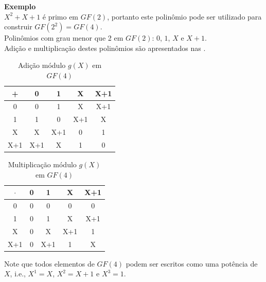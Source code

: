 \begin{frame}[allowframebreaks]
  \framebreak
  \textbf{Exemplo}\\
  $X^2 + X + 1$ é primo em $GF(2)$, portanto este polinômio pode ser utilizado para construir $GF(2^2) = GF(4)$.\\
  Polinômios com grau menor que 2 em $GF(2)$: $0$, $1$, $X$ e $X+1$.\\
  Adição e multiplicação destes polinômios são apresentados nas .
  \begin{minipage}{.45\linewidth}
    \small
    \begin{table}
      \caption{Adição módulo $g(X)$ em $GF(4)$}\label{tab-adgf4}
      \begin{tabular}{c|cccc}
        + & 0 & 1 & X & X+1 \\
        \hline
        0 & 0 & 1 & X & X+1 \\
        1 & 1 & 0 & X+1 & X \\
        X & X & X+1 & 0 & 1 \\
        X+1 & X+1 & X & 1 & 0 
      \end{tabular}
    \end{table}
  \end{minipage}%
  \begin{minipage}{.45\linewidth}
    \small
    \begin{table}
      \caption{Multiplicação módulo $g(X)$ em $GF(4)$}\label{tab-mugf4}
      \begin{tabular}{c|cccc}
        $\cdot$ & 0 & 1 & X & X+1 \\
        \hline
        0 & 0 & 0 & 0 & 0 \\
        1 & 0 & 1 & X & X+1 \\
        X & 0 & X & X+1 & 1 \\
        X+1 & 0 & X+1 & 1 & X 
      \end{tabular}
    \end{table}
  \end{minipage}
  Note que todos elementos de $GF(4)$ podem ser escritos como uma potência de $X$, i.e., $X^1=X$, $X^2 = X+1$ e $X^3 = 1$.



\end{frame}
